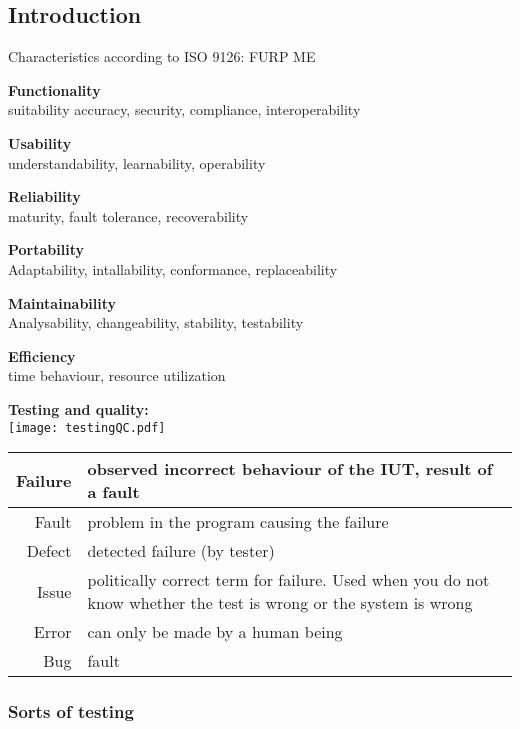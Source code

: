 \subsection{Introduction}
Characteristics according to ISO 9126: FURP ME
\begin{itemize*}
\item \textbf{Functionality}\\
 suitability accuracy, security, compliance, interoperability
\item \textbf{Usability}\\
 understandability, learnability, operability
\item \textbf{Reliability}\\
 maturity, fault tolerance, recoverability
\item \textbf{Portability}\\
 Adaptability, intallability, conformance, replaceability
\item \textbf{Maintainability}\\
 Analysability, changeability, stability, testability
\item \textbf{Efficiency}\\
 time behaviour, resource utilization
\end{itemize*}

\textbf{Testing and quality:}\\
\texttt{[image: testingQC.pdf]}

\begin{tabularx}{\linewidth}{r|X}
	Failure  & observed incorrect behaviour of the IUT, result of a fault \\ 
	\hline Fault  & problem in the program causing the failure \\ 
    \hline Defect & detected failure (by tester)\\ 
	\hline Issue & politically correct term for failure. Used when you do not know whether the test is wrong or the system is wrong \\ 
	\hline Error & can only be made by a human being  \\ 
	\hline Bug & fault \\ 	
\end{tabularx} 

\subsubsection{Sorts of testing}

